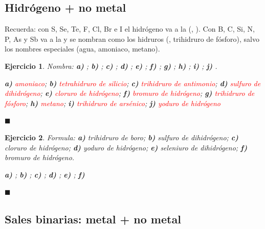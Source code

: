 \documentclass[12pt]{article}
\theoremstyle{mygreennumbox}
\newtheorem{ejercicioT}{Ejercicio}[section]
\newenvironment{exercise}{\begin{eBoxmygreen}\begin{ejercicioT}}{\hfill{\color{mygreen}\tiny\ensuremath{\blacksquare}}\end{ejercicioT}\end{eBoxmygreen}}
\begin{document}
\subsection{Hidrógeno + no metal}

Recuerda: con S, Se, Te, F, Cl, Br e I el hidrógeno va a la  (, ). Con B, C, Si, N, P, As y Sb va a la  y se nombran como los hidruros (, trihidruro de fósforo), salvo los nombres especiales (agua, amoniaco, metano).

\begin{exercise}
    Nombra: \textbf{a)} ; \textbf{b)} ; \textbf{c)} ; \textbf{d)} ; \textbf{e)} ; \textbf{f)} ; \textbf{g)} ; \textbf{h)} ; \textbf{i)} ; \textbf{j)} .
    \begin{solu}
        \textbf{a)} \textcolor{red}{amoniaco}; \textbf{b)} \textcolor{red}{tetrahidruro de silicio}; \textbf{c)} \textcolor{red}{trihidruro de antimonio}; \textbf{d)} \textcolor{red}{sulfuro de dihidrógeno}; \textbf{e)} \textcolor{red}{cloruro de hidrógeno}; \textbf{f)} \textcolor{red}{bromuro de hidrógeno}; \textbf{g)} \textcolor{red}{trihidruro de fósforo}; \textbf{h)} \textcolor{red}{metano}; \textbf{i)} \textcolor{red}{trihidruro de arsénico}; \textbf{j)} \textcolor{red}{yoduro de hidrógeno}
    \end{solu}
\end{exercise}

\begin{exercise}
    Formula: \textbf{a)} trihidruro de boro; \textbf{b)} sulfuro de dihidrógeno; \textbf{c)} cloruro de hidrógeno; \textbf{d)} yoduro de hidrógeno; \textbf{e)} seleniuro de dihidrógeno; \textbf{f)} bromuro de hidrógeno.
    \begin{solu}
        \textbf{a)} \textcolor{red}{}; \textbf{b)} \textcolor{red}{}; \textbf{c)} \textcolor{red}{}; \textbf{d)} \textcolor{red}{}; \textbf{e)} \textcolor{red}{}; \textbf{f)} \textcolor{red}{}
    \end{solu}
\end{exercise}

\subsection{Sales binarias: metal + no metal}
\end{document}
